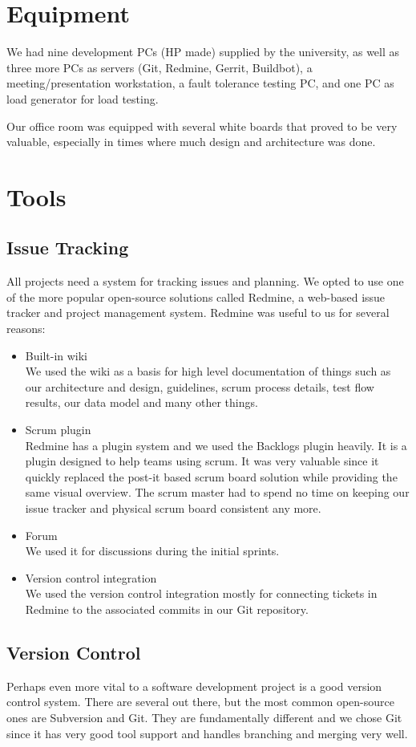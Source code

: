\documentclass[11pt,a4paper]{report}
\begin{document}
\section{Equipment}
We had nine development PCs (HP made) supplied by the university, as
well as three more PCs as servers (Git, Redmine, Gerrit, Buildbot),
a meeting/presentation workstation, a fault tolerance testing PC,
and one PC as load generator for load testing.

Our office room was equipped with several white boards that proved to be
very valuable, especially in times where much design and architecture was done.
\section{Tools}
\subsection{Issue Tracking}
All projects need a system for tracking issues and planning. We opted to use one
of the more popular open-source solutions called Redmine\cite{redmine}, a
web-based issue tracker and project management system. Redmine was useful to us
for several reasons:
\begin{itemize}
\item Built-in wiki \\
  We used the wiki as a basis for high level documentation of things such as our
  architecture and design, guidelines, scrum process details, test flow results,
  our data model and many other things.
\item Scrum plugin \\
  Redmine has a plugin system and we used the Backlogs plugin heavily. It is a
  plugin designed to help teams using scrum. It was very valuable since it
  quickly replaced the post-it based scrum board solution while providing the
  same visual overview. The scrum master had to spend no time on keeping our
  issue tracker and physical scrum board consistent any more.
\item Forum \\
  We used it for discussions during the initial sprints.
\item Version control integration \\
  We used the version control integration mostly for connecting tickets in
  Redmine to the associated commits in our Git repository.
\end{itemize}
\subsection{Version Control}
Perhaps even more vital to a software development project is a good version
control system. There are several out there, but the most common open-source
ones are Subversion and Git. They are fundamentally different and we chose Git
since it has very good tool support and handles branching and merging very well.
\end{document}
